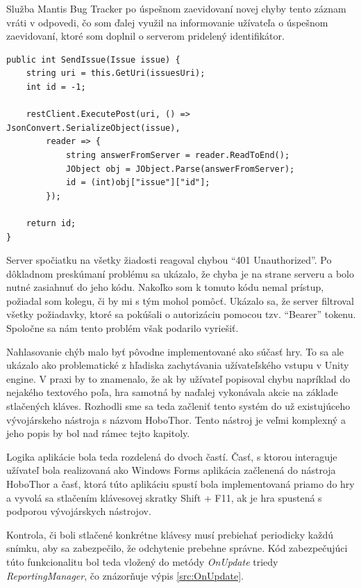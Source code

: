 \documentclass[slovak, bachelorpractice]{diploma}
\begin{document}
Služba Mantis Bug Tracker po úspešnom zaevidovaní novej chyby tento záznam vráti v odpovedi, čo som ďalej využil na informovanie užívateľa o úspešnom zaevidovaní, ktoré som doplnil o serverom pridelený identifikátor.
\vspace{10pt}
\begin{lstlisting}[label=src:SendIssue,caption={Programové odoslanie záznamu o chybe do služby Mantis Bug Tracker}]
public int SendIssue(Issue issue) {
	string uri = this.GetUri(issuesUri);
	int id = -1;

	restClient.ExecutePost(uri, () => JsonConvert.SerializeObject(issue),
        reader => {
            string answerFromServer = reader.ReadToEnd();
            JObject obj = JObject.Parse(answerFromServer);
            id = (int)obj["issue"]["id"];
        });

    return id;
}
\end{lstlisting}

Server spočiatku na všetky žiadosti reagoval chybou \enquote{401 Unauthorized}. Po dôkladnom preskúmaní problému sa ukázalo, že chyba je na strane serveru a bolo nutné zasiahnuť do jeho kódu. Nakoľko som k tomuto kódu nemal prístup, požiadal som kolegu, či by mi s tým mohol pomôcť. Ukázalo sa, že server filtroval všetky požiadavky, ktoré sa pokúšali o autorizáciu pomocou tzv. \enquote{Bearer} tokenu. Spoločne sa nám tento problém však podarilo vyriešiť. 

Nahlasovanie chýb malo byť pôvodne implementované ako súčasť hry. To sa ale ukázalo ako problematické z hľadiska zachytávania užívateľského vstupu v Unity engine. V praxi by to znamenalo, že ak by užívateľ popisoval chybu napríklad do nejakého textového poľa, hra samotná by naďalej vykonávala akcie na základe stlačených kláves. Rozhodli sme sa teda začleniť tento systém do už existujúceho vývojárskeho nástroja s názvom HoboThor. Tento nástroj je veľmi komplexný a jeho popis by bol nad rámec tejto kapitoly.

Logika aplikácie bola teda rozdelená do dvoch častí. Časť, s ktorou interaguje užívateľ bola realizovaná ako Windows Forms aplikácia začlenená do nástroja HoboThor a časť, ktorá túto aplikáciu spustí bola implementovaná priamo do hry a vyvolá sa stlačením klávesovej skratky Shift + F11, ak je hra spustená s podporou vývojárskych nástrojov. 

Kontrola, či boli stlačené konkrétne klávesy musí prebiehať periodicky každú snímku, aby sa zabezpečilo, že odchytenie prebehne správne. Kód zabezpečujúci túto funkcionalitu bol teda vložený do metódy \textit{OnUpdate} triedy \textit{ReportingManager}, čo znázorňuje výpis \ref{src:OnUpdate}. 
\end{document}
